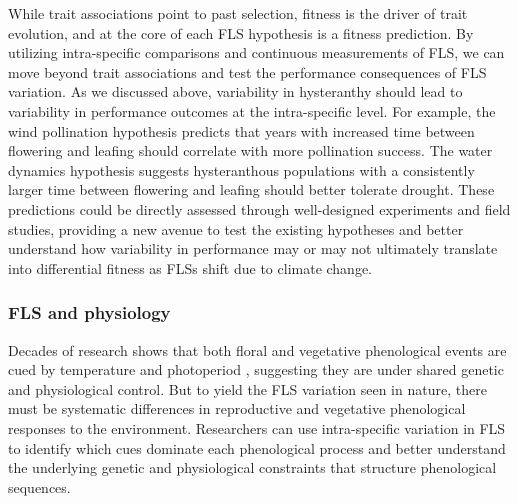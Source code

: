\documentclass{article}
\begin{document}
\noindent While trait associations point to past selection, fitness is the driver of trait evolution, and at the core of each FLS hypothesis is a fitness prediction. By utilizing intra-specific comparisons and continuous measurements of FLS, we can move beyond trait associations and test the performance consequences of FLS variation. As we discussed above, variability in hysteranthy should lead to variability in performance outcomes at the intra-specific level. For example, the wind pollination hypothesis predicts that years with increased time between flowering and leafing should correlate with more pollination success. The water dynamics hypothesis suggests hysteranthous populations with a consistently larger time between flowering and leafing should better tolerate drought. These predictions could be directly assessed through well-designed experiments and field studies, providing a new avenue to test the existing hypotheses and better understand how variability in performance may or may not ultimately translate into differential fitness as FLSs shift due to climate change.\\

\subsubsection*{FLS and physiology} 
\noindent Decades of research shows that both floral and vegetative phenological events are cued by temperature and photoperiod \citep{Forrest2010, Flynn2018}, suggesting they are under shared genetic and physiological control. But to yield the FLS variation seen in nature, there must be systematic differences in reproductive and vegetative phenological responses to the environment. Researchers can use intra-specific variation in FLS to identify which cues dominate each phenological process and better understand the underlying genetic and physiological constraints that structure phenological sequences.\\
\end{document}
